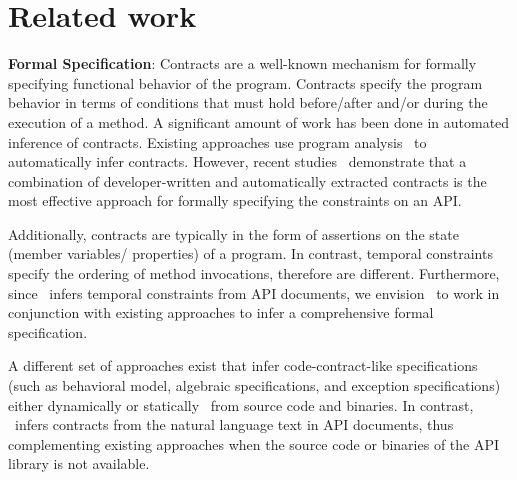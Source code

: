 \section{Related work}
\label{sec:related}



\textbf{Formal Specification}:
Contracts are a well-known mechanism for formally specifying functional behavior of the program. 
Contracts specify the program behavior in terms of conditions that must hold before/after and/or during the execution of a method.
A significant amount of work has been done in automated inference of contracts.
Existing approaches use program analysis~\cite{csallner08dysy,NimmerE02:ISSTA,Tillmann:2006:DLM:2105385.2105433}
to automatically infer contracts.
However, recent studies~\cite{Polikarpova2009ISSTA,Flanagan2001:HAA} demonstrate that a combination of developer-written and automatically extracted
contracts is the most effective approach for formally specifying the constraints on an API.

Additionally, contracts are typically in the form of assertions on the state (member variables/ properties) of a program. In contrast, temporal constraints specify the ordering of method invocations, therefore are different.
Furthermore, since \tool\ infers temporal constraints from API documents, we envision \tool\ to work in conjunction with existing approaches
to infer a comprehensive formal specification.
 
A different set of approaches exist that infer code-contract-like specifications (such as behavioral model, algebraic specifications, and exception specifications) either dynamically\cite{Henkel07discoveringdocumentation,Ghezzi:2009:SIB:1555001.1555057,Henkel:2008:DDA:1363102.1363105} or statically~\cite{Flanagan2001:HAA,Buse:2008:ADI:1390630.1390664} from source code and binaries. In contrast, \tool\ infers contracts from the natural language text in API documents,
thus complementing existing approaches when the source code or binaries of the API library is not available.


